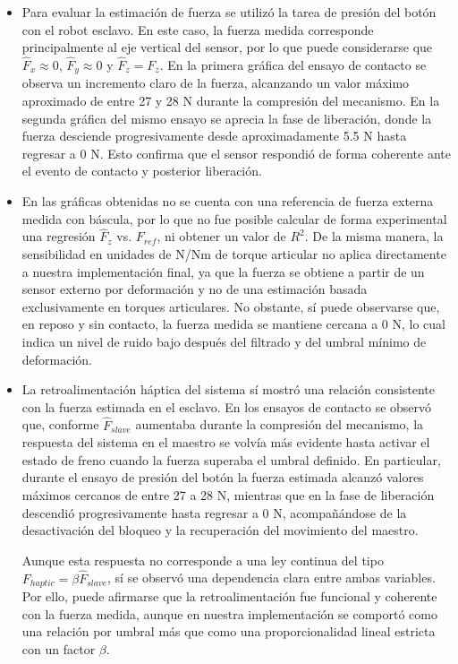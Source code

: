 \documentclass[journal,10pt,twoside]{IEEEtran}
\begin{document}
\begin{itemize}
    \item Para evaluar la estimación de fuerza se utilizó la tarea de presión del botón con el robot esclavo. En este caso, la fuerza medida corresponde principalmente al eje vertical del sensor, por lo que puede considerarse que \(\hat{F}_x \approx 0\), \(\hat{F}_y \approx 0\) y \(\hat{F}_z = F_z\). En la primera gráfica del ensayo de contacto se observa un incremento claro de la fuerza, alcanzando un valor máximo aproximado de entre 27 y 28 N durante la compresión del mecanismo. En la segunda gráfica del mismo ensayo se aprecia la fase de liberación, donde la fuerza desciende progresivamente desde aproximadamente 5.5 N hasta regresar a 0 N. Esto confirma que el sensor respondió de forma coherente ante el evento de contacto y posterior liberación.
    \\

    \item En las gráficas obtenidas no se cuenta con una referencia de fuerza externa medida con báscula, por lo que no fue posible calcular de forma experimental una regresión \(\hat{F}_z\) vs. \(F_{ref}\), ni obtener un valor de \(R^2\). De la misma manera, la sensibilidad en unidades de N/Nm de torque articular no aplica directamente a nuestra implementación final, ya que la fuerza se obtiene a partir de un sensor externo por deformación y no de una estimación basada exclusivamente en torques articulares. No obstante, sí puede observarse que, en reposo y sin contacto, la fuerza medida se mantiene cercana a 0 N, lo cual indica un nivel de ruido bajo después del filtrado y del umbral mínimo de deformación.
    \\

    \item La retroalimentación háptica del sistema sí mostró una relación consistente con la fuerza estimada en el esclavo. En los ensayos de contacto se observó que, conforme \(\hat{F}_{slave}\) aumentaba durante la compresión del mecanismo, la respuesta del sistema en el maestro se volvía más evidente hasta activar el estado de freno cuando la fuerza superaba el umbral definido. En particular, durante el ensayo de presión del botón la fuerza estimada alcanzó valores máximos cercanos de entre 27 a 28 N, mientras que en la fase de liberación descendió progresivamente hasta regresar a 0 N, acompañándose de la desactivación del bloqueo y la recuperación del movimiento del maestro. 

    Aunque esta respuesta no corresponde a una ley continua del tipo \(F_{haptic}=\beta \hat{F}_{slave}\), sí se observó una dependencia clara entre ambas variables. Por ello, puede afirmarse que la retroalimentación fue funcional y coherente con la fuerza medida, aunque en nuestra implementación se comportó como una relación por umbral más que como una proporcionalidad lineal estricta con un factor \(\beta\).
    \\


\end{itemize}
\end{document}
